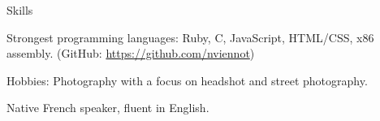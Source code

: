 \documentclass{resume} %
\begin{document}

\begin{rSection}{Skills}
\begin{rList}
\item Strongest programming languages: Ruby, C, JavaScript, HTML/CSS, x86 assembly. (GitHub: \url{https://github.com/nviennot})
\item Hobbies: Photography with a focus on headshot and street photography.
\item Native French speaker, fluent in English.
\end{rList}
\end{rSection}
\end{document}
